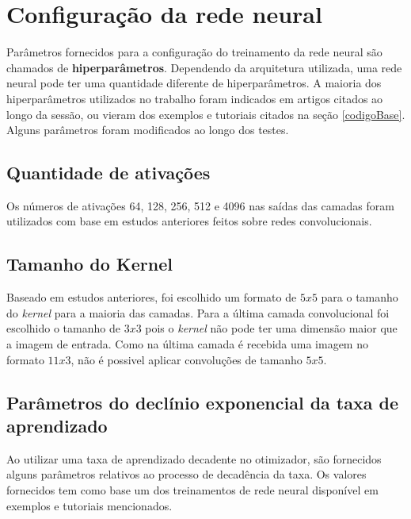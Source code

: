 \section{Configuração da rede neural}

Parâmetros fornecidos para a configuração do treinamento da rede
neural são chamados de {\bf hiperparâmetros}. Dependendo da
arquitetura utilizada, uma rede neural pode ter uma quantidade
diferente de hiperparâmetros. A maioria dos hiperparâmetros utilizados
no trabalho foram indicados em artigos citados ao longo da sessão, ou
vieram dos exemplos e tutoriais citados na seção
\ref{codigoBase}. Alguns parâmetros foram modificados ao longo dos
testes.

\subsection{Quantidade de ativações}

Os números de ativações 64, 128, 256, 512 e 4096 nas saídas das
camadas foram utilizados com base em estudos anteriores feitos sobre
redes convolucionais\cite{Krizhevsky}.

\subsection{Tamanho do Kernel}

Baseado em estudos anteriores\cite{Goodfellow}, foi escolhido um formato
de $5x5$ para o tamanho do \textit{kernel} para a maioria das
camadas. Para a última camada convolucional foi escolhido o tamanho
de $3x3$ pois o \textit{kernel} não pode ter uma dimensão maior que
a imagem de entrada. Como na última camada é recebida uma imagem no
formato $11x3$, não é possivel aplicar convoluções de tamanho $5x5$.

\subsection{Parâmetros do declínio exponencial da taxa de aprendizado}

Ao utilizar uma taxa de aprendizado decadente no otimizador, são
fornecidos alguns parâmetros relativos ao processo de decadência da
taxa. Os valores fornecidos tem como base um dos treinamentos de rede
neural disponível em exemplos e tutoriais mencionados\cite{tensorCode}.

